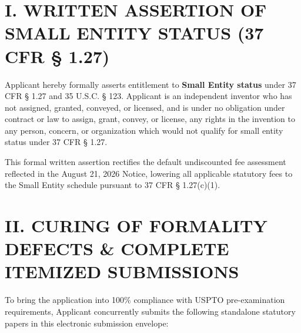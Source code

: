 \documentclass[11pt,letterpaper]{article}
\begin{document}
\section*{I. WRITTEN ASSERTION OF SMALL ENTITY STATUS (37 CFR \S{} 1.27)}

Applicant hereby formally asserts entitlement to \textbf{Small Entity status} under 37 CFR \S{} 1.27 and 35 U.S.C. \S{} 123. Applicant is an independent inventor who has not assigned, granted, conveyed, or licensed, and is under no obligation under contract or law to assign, grant, convey, or license, any rights in the invention to any person, concern, or organization which would not qualify for small entity status under 37 CFR \S{} 1.27.

This formal written assertion rectifies the default undiscounted fee assessment reflected in the August 21, 2026 Notice, lowering all applicable statutory fees to the Small Entity schedule pursuant to 37 CFR \S{} 1.27(c)(1).

\section*{II. CURING OF FORMALITY DEFECTS \& COMPLETE ITEMIZED SUBMISSIONS}

To bring the application into 100\% compliance with USPTO pre-examination requirements, Applicant concurrently submits the following standalone statutory papers in this electronic submission envelope:
\end{document}
